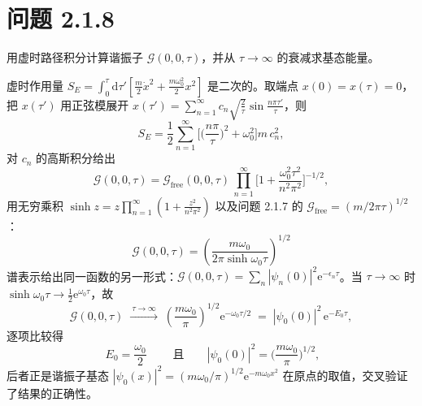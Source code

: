 \section*{问题 2.1.8}
\begin{problem}
用虚时路径积分计算谐振子 $\mathcal G(0,0,\tau)$，并从 $\tau\to\infty$ 的衰减求基态能量。
\end{problem}
\solution
虚时作用量 $S_E=\int_0^\tau\mathrm{d}\tau'[\frac m2\dot x^2+\frac{m\omega_0^2}2x^2]$ 是二次的。取端点 $x(0)=x(\tau)=0$，把 $x(\tau')$ 用正弦模展开 $x(\tau')=\sum_{n=1}^\infty c_n\sqrt{\frac2\tau}\sin\frac{n\pi\tau'}\tau$，则
\begin{equation*}
S_E=\frac12\sum_{n=1}^\infty\Big[\Big(\frac{n\pi}\tau\Big)^2+\omega_0^2\Big]m\,c_n^2,
\end{equation*}
对 $c_n$ 的高斯积分给出
\begin{equation*}
\mathcal G(0,0,\tau)=\mathcal G_{\text{free}}(0,0,\tau)\,
\prod_{n=1}^\infty\Big[1+\frac{\omega_0^2\tau^2}{n^2\pi^2}\Big]^{-1/2},
\end{equation*}
用无穷乘积 $\sinh z=z\prod_{n=1}^\infty(1+\frac{z^2}{n^2\pi^2})$ 以及问题 2.1.7 的 $\mathcal G_{\text{free}}=(m/2\pi\tau)^{1/2}$：
\begin{equation*}
\boxed{\;\mathcal G(0,0,\tau)=\left(\frac{m\omega_0}{2\pi\sinh\omega_0\tau}\right)^{1/2}\;}
\end{equation*}
谱表示给出同一函数的另一形式：$\mathcal G(0,0,\tau)=\sum_n|\psi_n(0)|^2\mathrm{e}^{-\epsilon_n\tau}$。当 $\tau\to\infty$ 时 $\sinh\omega_0\tau\to\frac12\mathrm{e}^{\omega_0\tau}$，故
\begin{equation*}
\mathcal G(0,0,\tau)\;\xrightarrow{\ \tau\to\infty\ }\;\left(\frac{m\omega_0}{\pi}\right)^{1/2}\mathrm{e}^{-\omega_0\tau/2}
\;=\;|\psi_0(0)|^2\,\mathrm{e}^{-E_0\tau},
\end{equation*}
逐项比较得
\begin{equation*}
\boxed{\;E_0=\frac{\omega_0}{2}\;}\qquad\text{且}\qquad |\psi_0(0)|^2=\Big(\frac{m\omega_0}{\pi}\Big)^{1/2},
\end{equation*}
后者正是谐振子基态 $|\psi_0(x)|^2=(m\omega_0/\pi)^{1/2}\mathrm{e}^{-m\omega_0x^2}$ 在原点的取值，交叉验证了结果的正确性。

